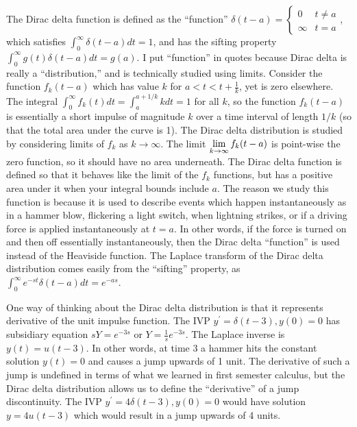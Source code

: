 The Dirac delta function is defined as the ``function'' $\delta(t-a) = \begin{cases}0 &t\neq a\\\infty &t=a\end{cases}$, which satisfies $\int_0^\infty \delta(t-a)dt = 1$, and has the sifting property $\int_0^\infty g(t)\delta(t-a)dt = g(a)$.  I put ``function'' in quotes because Dirac delta is really a ``distribution,'' and is technically studied using limits. Consider the function $f_k(t-a)$ which has value $k$ for $a<t<t+\frac{1}{k}$, yet is zero elsewhere. The integral $\int_0^\infty f_k(t)dt = \int_{a}^{a+1/k}kdt = 1$ for all $k$, so the function $f_k(t-a)$ is essentially a short impulse of magnitude $k$ over a time interval of length $1/k$ (so that the total area under the curve is 1). The Dirac delta distribution is studied by considering limits of $f_k$ as $k\to \infty$. The limit $\displaystyle\lim_{k\to\infty}f_k(t-a)$ is point-wise the zero function, so it should have no area underneath. The Dirac delta function is defined so that it behaves like the limit of the $f_k$ functions, but has a positive area under it when your integral bounds include $a$. The reason we study this function is because it is used to describe events which happen instantaneously as in a hammer blow, flickering a light switch, when lightning strikes, or if a driving force is applied instantaneously at $t=a$. In other words, if the force is turned on and then off essentially instantaneously, then the Dirac delta ``function'' is used instead of the Heaviside function. The Laplace transform of the Dirac delta distribution comes easily from the ``sifting'' property, as $\int_0^\infty e^{-st}\delta(t-a)dt = e^{-as}$.

One way of thinking about the Dirac delta distribution is that it represents derivative of the unit impulse function.  The IVP $y^\prime = \delta(t-3),y(0)=0$ has subsidiary equation $sY=e^{-3s}$ or $Y=\frac{1}{s}e^{-3s}$.  The Laplace inverse is $y(t) = u(t-3)$. In other words, at time 3 a hammer hits the constant solution $y(t)=0$ and causes a jump upwards of 1 unit. The derivative of such a jump is undefined in terms of what we learned in first semester calculus, but the Dirac delta distribution allows us to define the ``derivative'' of a jump discontinuity.  The IVP $y^\prime = 4\delta(t-3),y(0)=0$ would have solution $y=4u(t-3)$ which would result in a jump upwards of 4 units.


